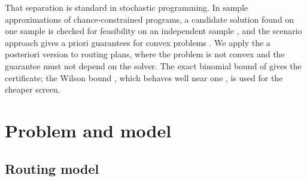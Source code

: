 \documentclass[11pt,a4paper]{article}
\theoremstyle{remark}
\begin{document}
That separation is standard in stochastic programming. In sample approximations of
chance-constrained programs, a candidate solution found on one sample is checked
for feasibility on an independent sample \citep{luedtke2008,ahmed2008}, and the
scenario approach gives a priori guarantees for convex problems
\citep{campi2008}. We apply the a posteriori version to routing plans, where the
problem is not convex and the guarantee must not depend on the solver. The exact
binomial bound of \citet{clopper1934} gives the certificate; the Wilson bound
\citep{wilson1927}, which behaves well near one \citep{brown2001}, is used for the
cheaper screen.

\section{Problem and model}\label{sec:model}

\subsection{Routing model}
\end{document}
